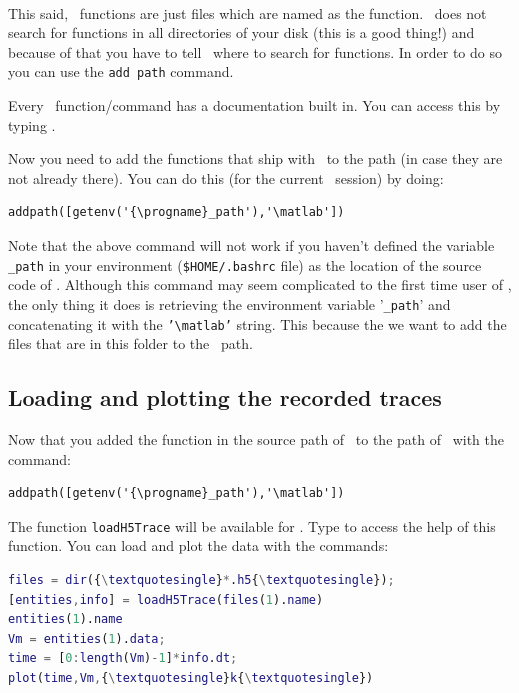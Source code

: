 \paragraph{}
This said, \matlab\ functions are just files which are named as the
function. \matlab\ does not search for functions in all directories of
your disk (this is a good thing!) and because of that you have to tell
\matlab\ where to search for functions. In order to do so you can use
the \texttt{add path} command.

Every \matlab\ function/command has a documentation built in. You can
access this by typing .

Now you need to add the functions that ship with \progname\ to the
path (in case they are not already there). You can do this (for the
current \matlab\ session) by doing:

\begin{lstlisting}[escapeinside=\{\}]
addpath([getenv('{\progname}_path'),'\matlab'])
\end{lstlisting}

Note that the above command will not work if you haven't defined the
variable \texttt{\progname\_path} in your environment
(\texttt{\$HOME/.bashrc} file) as the location of the source code of
\progname. Although this command may seem complicated to the first
time user of \matlab, the only thing it does is retrieving the
environment variable '\texttt{\progname\_path}' and concatenating it
with the \texttt{'\textbackslash matlab'} string. This because the we
want to add the files that are in this folder to the \matlab\ path.

\subsection{Loading and plotting the recorded traces}

Now that you added the function in the source path of \progname\ to
the path of \matlab\ with the command:

\begin{lstlisting}[escapeinside=\{\}]
addpath([getenv('{\progname}_path'),'\matlab'])
\end{lstlisting}

The function \texttt{loadH5Trace} will be available for \matlab. Type
 to access the help of this function.
You can load and plot the data with the commands:

\begin{lstlisting}[language=matlab,morekeywords={loadH5Trace,ls},escapeinside=\{\}]
files = dir({\textquotesingle}*.h5{\textquotesingle});
[entities,info] = loadH5Trace(files(1).name)
entities(1).name
Vm = entities(1).data;
time = [0:length(Vm)-1]*info.dt;
plot(time,Vm,{\textquotesingle}k{\textquotesingle})
\end{lstlisting}

